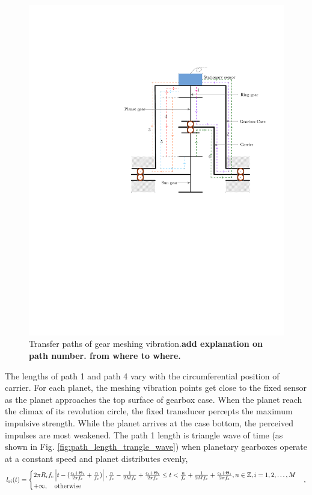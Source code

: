 \documentclass[a4paper,fleqn]{cas-sc}%
\begin{document}
\begin{figure}[pos=htbp]
    \centering
    \includegraphics[scale=0.5]{transfer_path.pdf}
    \caption{Transfer paths of gear meshing vibration.\textbf{add explanation on path number. from where to where.}\label{fig:transfer_path}}
\end{figure}
\par The lengths of path 1 and path 4 vary with the circumferential position of carrier. For each planet, the meshing vibration points get close to the fixed sensor as the planet approaches the top surface of gearbox case. When the planet reach the climax of its revolution circle, the fixed transducer percepts the maximum impulsive strength. While the planet arrives at the case bottom, the perceived impulses are most weakened. The path 1 length is triangle wave of time (as shown in Fig. \ref{fig:path_length_trangle_wave}) when planetary gearboxes operate at a constant speed and planet distributes evenly, 
\begin{equation}
    l_{{\rm r}i}(t)=
    \begin{cases}
        2 \pi R_{\rm r} f_{\rm c} \left|t-(\frac{\epsilon_i+\Theta_i}{2 \pi f_{\rm c}} + \frac{n}{f_{\rm c}}) \right|, \frac{n}{f_{\rm c}} - \frac{1}{2 M f_{\rm c}} + \frac{\epsilon_i+\Theta_i}{2\pi  f_{\rm c}} \leq t < \frac{n}{f_{\rm c}} + \frac{1}{2 M f_{\rm c}} + \frac{\epsilon_i+\Theta_i}{2\pi f_{\rm c}}, n\in \mathbb{Z} , i=1,2,\ldots,M\\
        +\infty, \quad \text{otherwise}
    \end{cases},
\end{equation}
\end{document}
